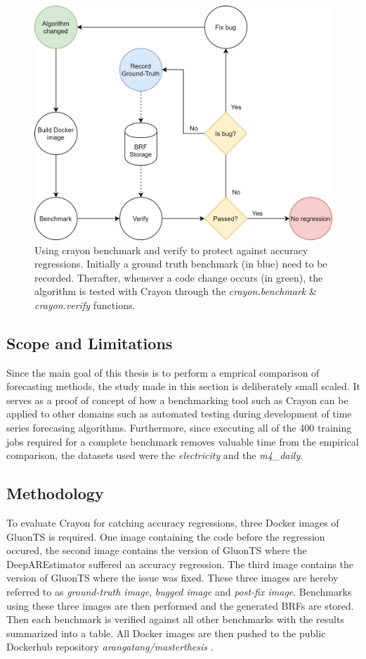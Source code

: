 \begin{figure}[h]
  \centering
  \includegraphics[width=\linewidth]{./img/crayon_for_regression_testing.png}
  \caption{Using crayon benchmark and verify to protect against accuracy regressions. Initially a ground truth benchmark (in blue) need to be recorded. Therafter, whenever a code change occurs (in green), the algorithm is tested with Crayon through the \textit{crayon.benchmark} \& \textit{crayon.verify} functions.}
  \label{fig:crayon_as_test}
\end{figure}

\subsection{Scope and Limitations}
Since the main goal of this thesis is to perform a emprical comparison of forecasting methods, the study made in this section is deliberately small scaled. It serves as a proof of concept of how a benchmarking tool such as Crayon can be applied to other domains such as automated testing during development of time series forecasing algorithms. Furthermore, since executing all of the 400 training jobs required for a complete benchmark removes valuable time from the empirical comparison, the datasets used were the \textit{electricity} and the \textit{m4\_daily}.

\subsection{Methodology}
To evaluate Crayon for catching accuracy regressions, three Docker images of GluonTS is required. One image containing the code before the regression occured, the second image contains the version of GluonTS where the DeepAREstimator suffered an accuracy regression. The third image contains the version of GluonTS where the issue was fixed. These three images are hereby referred to as \textit{ground-truth image}, \textit{bugged image} and \textit{post-fix image}. Benchmarks using these three images are then performed and the generated BRFs are stored. Then each benchmark is verified against all other benchmarks with the results summarized into a table. All Docker images are then pushed to the public Dockerhub repository \textit{arangatang/masterthesis} \cite{dockerhub_arangatang}.


